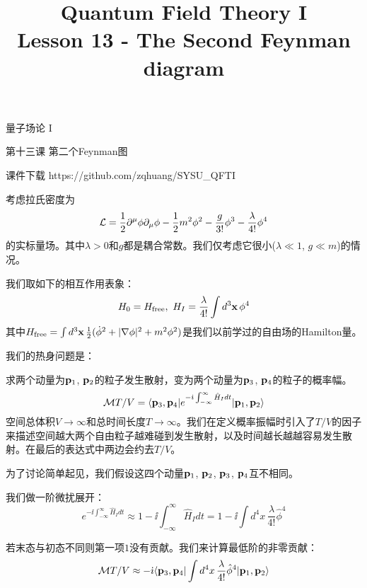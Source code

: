 \documentclass[CJK]{beamer}
\title{Quantum Field Theory I \\ Lesson 13 - The Second Feynman diagram}
\author{}
\date{}
\begin{document}
\begin{frame}
 
\begin{center}
\begin{Large}
\bch
量子场论 I 

{\vskip 0.3in}

第十三课 第二个Feynman图

\ech
\end{Large}
\end{center}

\vskip 0.2in

\bch
课件下载
\ech
https://github.com/zqhuang/SYSU\_QFTI

\end{frame}


\begin{frame} 
\bch
考虑拉氏密度为
$${\mathcal{L}} = \frac{1}{2}\partial^\mu\phi\partial_\mu\phi - \frac{1}{2}m^2\phi^2 - \frac{g}{3!}\phi^3- \frac{\lambda}{4!}\phi^4$$
的实标量场。其中$\lambda>0$和$g$都是耦合常数。我们仅考虑它很小($\lambda \ll 1$, $g\ll m$)的情况。

我们取如下的相互作用表象：
$$ H_0 = H_{\rm free},\ H_I = \frac{\lambda}{4!} \int d^3{\mathbf{x}}\, \phi^4$$
其中$H_{\rm free} = \int d^3{\mathbf{x}}\, \frac{1}{2}(\dot\phi^2 + |\nabla \phi|^2 + m^2\phi^2)$是我们以前学过的自由场的Hamilton量。

\ech
\end{frame}

\begin{frame} 
\bch
我们的热身问题是：

求两个动量为${\mathbf{p}}_1$, ${\mathbf{p}}_2$的粒子发生散射，变为两个动量为${\mathbf{p}}_3$, ${\mathbf{p}}_4$的粒子的概率幅。
$${\mathcal{M}} T/V= \langle {\mathbf{p}}_3, {\mathbf{p}}_4|  e^{-{\dot{\imath}}\int_{-\infty}^\infty \hat{H}_I dt}|{\mathbf{p}}_1,{\mathbf{p}}_2\rangle$$
空间总体积$V\rightarrow \infty$和总时间长度$T\rightarrow \infty$。我们在定义概率振幅时引入了$T/V$的因子来描述空间越大两个自由粒子越难碰到发生散射，以及时间越长越越容易发生散射。在最后的表达式中两边会约去$T/V$。

为了讨论简单起见，我们假设这四个动量${\mathbf{p}}_1$, ${\mathbf{p}}_2$, ${\mathbf{p}}_3$, ${\mathbf{p}}_4$互不相同。
\ech
\end{frame}

\begin{frame} 
\bch

我们做一阶微扰展开：
$$e^{-\ii\int_{-\infty}^\infty \hat{H}_I dt}\approx 1 -\ii\int_{-\infty}^\infty \hat{H}_I dt = 1-\ii\int d^4x\, \frac{\lambda}{4!}\hat\phi^4 $$

若末态与初态不同则第一项$1$没有贡献。我们来计算最低阶的非零贡献：
$${\mathcal{M}} T/V \approx -{\dot{\imath}} \langle {\mathbf{p}}_3, {\mathbf{p}}_4| \int d^4x\, \frac{\lambda}{4!}\hat\phi^4 |{\mathbf{p}}_1,{\mathbf{p}}_2\rangle$$

\ech
\end{frame}
\end{document}
